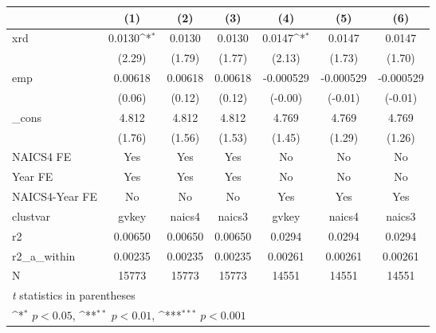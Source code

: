 {
\def\sym#1{\ifmmode^{#1}\else\(^{#1}\)\fi}
\begin{tabular}{l*{6}{c}}
\hline\hline
            &\multicolumn{1}{c}{(1)}         &\multicolumn{1}{c}{(2)}         &\multicolumn{1}{c}{(3)}         &\multicolumn{1}{c}{(4)}         &\multicolumn{1}{c}{(5)}         &\multicolumn{1}{c}{(6)}         \\
\hline
xrd         &      0.0130\sym{*}  &      0.0130         &      0.0130         &      0.0147\sym{*}  &      0.0147         &      0.0147         \\
            &      (2.29)         &      (1.79)         &      (1.77)         &      (2.13)         &      (1.73)         &      (1.70)         \\
[1em]
emp         &     0.00618         &     0.00618         &     0.00618         &   -0.000529         &   -0.000529         &   -0.000529         \\
            &      (0.06)         &      (0.12)         &      (0.12)         &     (-0.00)         &     (-0.01)         &     (-0.01)         \\
[1em]
\_cons      &       4.812         &       4.812         &       4.812         &       4.769         &       4.769         &       4.769         \\
            &      (1.76)         &      (1.56)         &      (1.53)         &      (1.45)         &      (1.29)         &      (1.26)         \\
[1em]
NAICS4 FE   &         Yes         &         Yes         &         Yes         &          No         &          No         &          No         \\
[1em]
Year FE     &         Yes         &         Yes         &         Yes         &          No         &          No         &          No         \\
[1em]
NAICS4-Year FE&          No         &          No         &          No         &         Yes         &         Yes         &         Yes         \\
\hline
clustvar    &       gvkey         &      naics4         &      naics3         &       gvkey         &      naics4         &      naics3         \\
r2          &     0.00650         &     0.00650         &     0.00650         &      0.0294         &      0.0294         &      0.0294         \\
r2\_a\_within &     0.00235         &     0.00235         &     0.00235         &     0.00261         &     0.00261         &     0.00261         \\
N           &       15773         &       15773         &       15773         &       14551         &       14551         &       14551         \\
\hline\hline
\multicolumn{7}{l}{\footnotesize \textit{t} statistics in parentheses}\\
\multicolumn{7}{l}{\footnotesize \sym{*} \(p<0.05\), \sym{**} \(p<0.01\), \sym{***} \(p<0.001\)}\\
\end{tabular}
}
